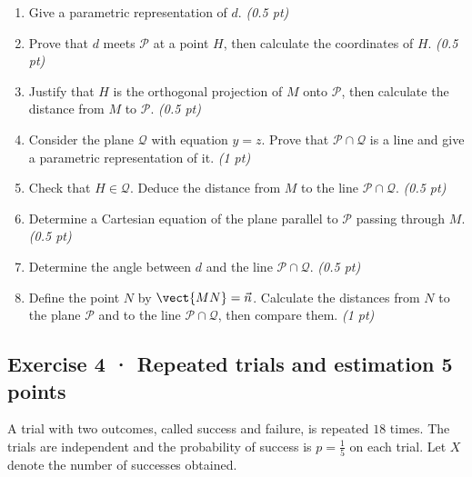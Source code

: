\begin{enumerate}

\item Give a parametric representation of $d$. \hfill\textit{(0.5 pt)}

\item Prove that $d$ meets $\mathcal P$ at a point $H$, then calculate the coordinates of $H$. \hfill\textit{(0.5 pt)}

\item Justify that $H$ is the orthogonal projection of $M$ onto $\mathcal P$, then calculate the distance from $M$ to $\mathcal P$. \hfill\textit{(0.5 pt)}

\item Consider the plane $\mathcal Q$ with equation $y=z$. Prove that $\mathcal P\cap\mathcal Q$ is a line and give a parametric representation of it. \hfill\textit{(1 pt)}

\item Check that $H\in\mathcal Q$. Deduce the distance from $M$ to the line $\mathcal P\cap\mathcal Q$. \hfill\textit{(0.5 pt)}

\item Determine a Cartesian equation of the plane parallel to $\mathcal P$ passing through $M$. \hfill\textit{(0.5 pt)}

\item Determine the angle between $d$ and the line $\mathcal P\cap\mathcal Q$. \hfill\textit{(0.5 pt)}

\item Define the point $N$ by $\vect{MN}=\vec n$. Calculate the distances from $N$ to the plane $\mathcal P$ and to the line $\mathcal P\cap\mathcal Q$, then compare them. \hfill\textit{(1 pt)}

\end{enumerate}

\subsection*{Exercise 4 · Repeated trials and estimation \hfill 5 points}A trial with two outcomes, called success and failure, is repeated $18$ times. The trials are independent and the probability of success is $p=\frac{1}{5}$ on each trial. Let $X$ denote the number of successes obtained.


